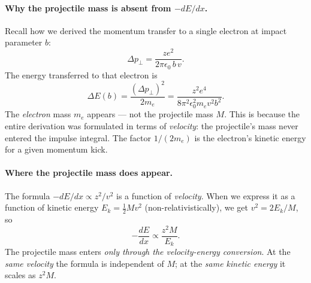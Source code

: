 \paragraph{Why the projectile mass is absent from $-dE/dx$.}
Recall how we derived the momentum transfer to a single electron at impact
parameter $b$:
\begin{equation}
  \label{eq:lec07:delta_p}
  \Delta p_\perp = \frac{ze^2}{2\pi\epsilon_0\,b\,v}.
\end{equation}
The energy transferred to that electron is
\begin{equation}
  \label{eq:lec07:delta_E}
  \Delta E(b) = \frac{(\Delta p_\perp)^2}{2m_e} = \frac{z^2 e^4}{8\pi^2\epsilon_0^2 m_e v^2 b^2}.
\end{equation}
The \emph{electron} mass $m_e$ appears — not the projectile mass $M$.  This is
because the entire derivation was formulated in terms of \emph{velocity}: the
projectile's mass never entered the impulse integral.  The factor $1/(2m_e)$ is
the electron's kinetic energy for a given momentum kick.


\paragraph{Where the projectile mass does appear.}
The formula $-dE/dx \propto z^2/v^2$ is a function of \emph{velocity}.  When
we express it as a function of kinetic energy $E_k = \frac{1}{2}Mv^2$
(non-relativistically), we get $v^2 = 2E_k/M$, so
\begin{equation}
  \label{eq:lec07:dEdx_energy}
  -\frac{dE}{dx} \propto \frac{z^2 M}{E_k}.
\end{equation}
The projectile mass enters \emph{only through the velocity-energy conversion}.
At the \emph{same velocity} the formula is independent of $M$;
at the \emph{same kinetic energy} it scales as $z^2 M$.

